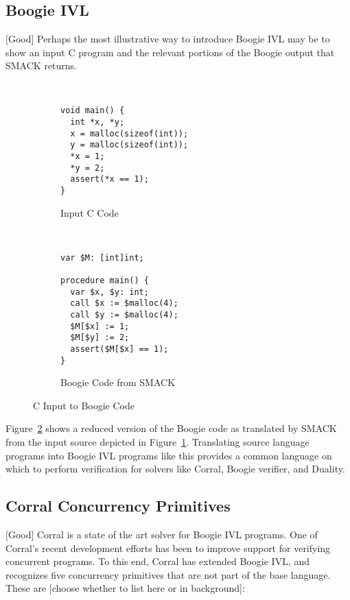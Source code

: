 \subsection{Boogie IVL}
[Good]
Perhaps the most illustrative way to introduce Boogie IVL may be to
show an input C program and the relevant portions of the Boogie output
that SMACK returns.
\begin{figure}[h]
\centering
\begin{subfigure}[b]{.45\textwidth}
\centering
\begin{lstlisting}


void main() {
  int *x, *y;
  x = malloc(sizeof(int));
  y = malloc(sizeof(int));
  *x = 1;
  *y = 2;
  assert(*x == 1);
}
\end{lstlisting}
\caption{Input C Code}\label{fig:cToBoogie_a}
\end{subfigure}
~
\begin{subfigure}[b]{.45\textwidth}
\centering
\begin{lstlisting}[language=boogie]
var $M: [int]int;

procedure main() {
  var $x, $y: int;
  call $x := $malloc(4);
  call $y := $malloc(4);
  $M[$x] := 1;
  $M[$y] := 2;
  assert($M[$x] == 1);
}
\end{lstlisting}
\caption{Boogie Code from SMACK}\label{fig:cToBoogie_b}
\end{subfigure}
\caption{C Input to Boogie Code}\label{fig:cToBoogie}
\end{figure}

Figure~\ref{fig:cToBoogie_b} shows a reduced version of the Boogie
code as translated by SMACK from the input source depicted in
Figure~\ref{fig:cToBoogie_a}.  Translating source language programs
into Boogie IVL programs like this provides a common language on which
to perform verification for solvers like Corral, Boogie verifier, and
Duality.  

\subsection{Corral Concurrency Primitives}
[Good]
Corral is a state of the art solver for Boogie IVL programs.  One of
Corral's recent development efforts has been to improve support for
verifying concurrent programs.  To this end, Corral has extended
Boogie IVL, and recognizes five concurrency primitives that are not
part of the base language.  These are [choose whether to list here or
in background]: 

